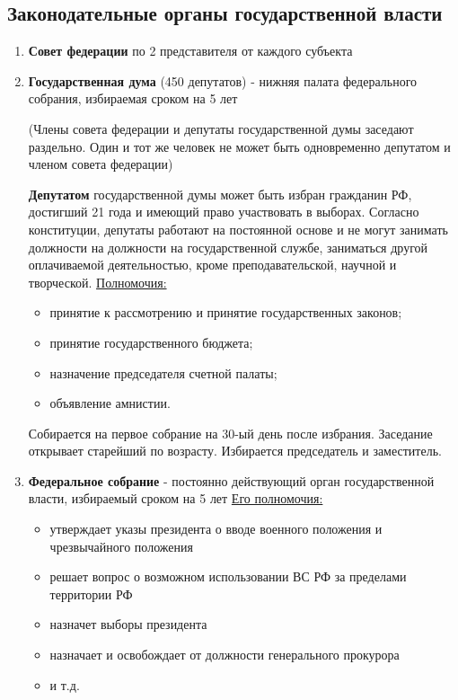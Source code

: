 \documentclass[a5paper,10pt]{article}
\begin{document}
		\subsection{Законодательные органы государственной власти}
			\begin{enumerate}
				\item \textbf{Совет федерации} по 2 представителя от каждого субъекта
				
				\item \textbf{Государственная дума} (450 депутатов) - нижняя палата федерального собрания, избираемая сроком на 5 лет \par
					(Члены совета федерации и депутаты государственной думы заседают раздельно. Один и тот же человек не может быть одновременно депутатом и членом совета федерации) \par
					\textbf{Депутатом} государственной думы может быть избран гражданин РФ, достигший 21 года и имеющий право участвовать в выборах.
					Согласно конституции, депутаты работают на постоянной основе и не могут занимать должности на должности на государственной службе, заниматься другой оплачиваемой деятельностью, кроме преподавательской, научной и творческой.
					\underline{Полномочия:}
					\begin{itemize}
						\item принятие к рассмотрению и принятие государственных законов;
						\item принятие государственного бюджета;
						\item назначение председателя счетной палаты;
						\item объявление амнистии.
					\end{itemize}
					Собирается на первое собрание на 30-ый день после избрания. Заседание открывает старейший по возрасту. Избирается председатель и заместитель.

				\item \textbf{Федеральное собрание} - постоянно действующий орган государственной власти, избираемый сроком на 5 лет
					\underline{Его полномочия:}
					\begin{itemize}
						\item утверждает указы президента о вводе военного положения и чрезвычайного положения
						\item решает вопрос о возможном использовании ВС РФ за пределами территории РФ
						\item назначет выборы президента
						\item назначает и освобождает от должности генерального прокурора
						\item и т.д.
					\end{itemize}
			\end{enumerate}
\end{document}
